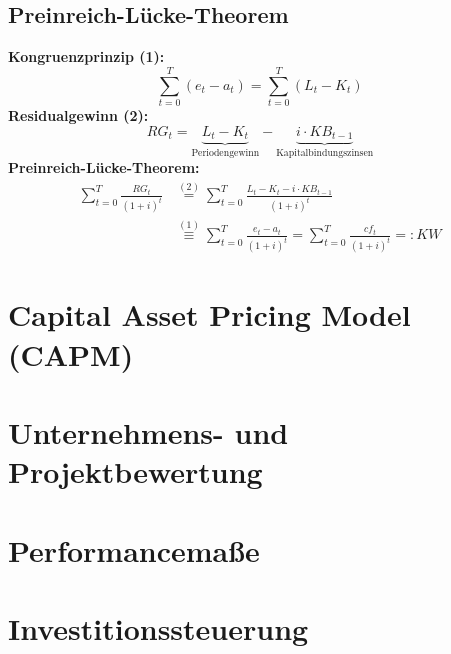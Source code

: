 \documentclass[a4paper]{scrartcl}
\begin{document}
\begin{multicols}{3}
\subsection{Preinreich-Lücke-Theorem}

\textbf{Kongruenzprinzip (1):}
$$\sum^{T}_{t=0} (e_t-a_t) = \sum^{T}_{t=0} (L_t-K_t)$$
\textbf{Residualgewinn (2):}
$$RG_t=\underbrace{L_t-K_t}_\text{Periodengewinn}-\underbrace{i \cdot KB_{t-1}}_\text{Kapitalbindungszinsen}$$
\textbf{Preinreich-Lücke-Theorem:}
\begin{equation*}
\begin{split}
\sum^{T}_{t=0} \frac{RG_t}{(1+i)^t} 
  &\overset{(2)}{=} \sum^{T}_{t=0} \frac{L_t - K_t - i \cdot KB_{t-1}}{(1+i)^t}\\
  &\overset{(1)}{\equiv} \sum^{T}_{t=0} \frac{e_t - a_t}{(1+i)^t}
  = \sum^{T}_{t=0} \frac{cf_t}{(1+i)^t}
  =: KW
\end{split}
\end{equation*}

\section{Capital Asset Pricing Model (CAPM)}

\blindtext

\section{Unternehmens- und Projektbewertung}

\blindtext

\section{Performancemaße}

\blindtext

\section{Investitionssteuerung}

\blindtext
\blindtext
\blindtext
\blindtext
\blindtext
\blindtext
\blindtext
\blindtext
\blindtext
\blindtext
\blindtext
\blindtext
\blindtext

\end{multicols}
\end{document}
